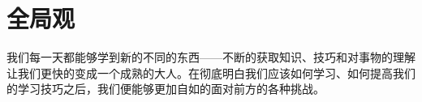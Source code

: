 \chapter{全局观}
    我们每一天都能够学到新的不同的东西——不断的获取知识、技巧和对事物的理解让我们更快的变成一个成熟的大人。在彻底明白我们应该如何学习、如何提高我们的学习技巧之后，我们便能够更加自如的面对前方的各种挑战。



     
